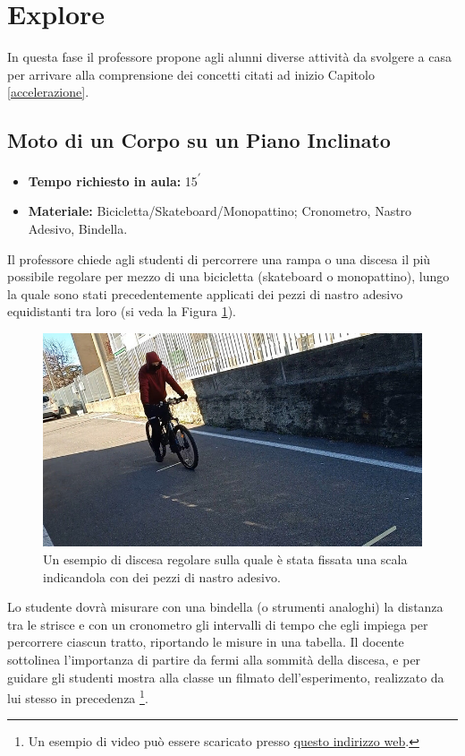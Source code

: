 \documentclass{report} \usepackage[T1]{fontenc} \usepackage[italian]{babel}
\begin{document}
\section{Explore}

In questa fase il professore propone agli alunni diverse attività da svolgere a
casa per arrivare alla comprensione dei concetti citati ad inizio Capitolo \ref{accelerazione}.

\subsection{Moto di un Corpo su un Piano Inclinato}

\begin{itemize}
\item \textbf{Tempo richiesto in aula:} 15\textsuperscript{$\prime$}
\item \textbf{Materiale:} Bicicletta/Skateboard/Monopattino; Cronometro,
Nastro Adesivo, Bindella.
\end{itemize}

Il professore chiede agli studenti di percorrere una rampa o
una discesa il più possibile regolare per mezzo di una bicicletta (skateboard o
monopattino), lungo la quale sono stati precedentemente applicati dei pezzi di nastro
adesivo equidistanti tra loro (si veda la Figura \ref{fig:bicicletta_rampa}).
\begin{figure}[H]
\centering
  \includegraphics[width=\textwidth]{bicicletta_rampa}
  \caption{Un esempio di discesa regolare sulla quale è stata fissata
           una scala indicandola con dei pezzi di nastro adesivo.
          }
  \label{fig:bicicletta_rampa}
\end{figure}
Lo studente dovrà misurare con una bindella (o strumenti analoghi)
la distanza tra le strisce e con un cronometro gli intervalli di tempo che egli impiega
per percorrere ciascun tratto, riportando le misure in una tabella.
Il docente sottolinea l’importanza di partire da fermi alla sommità della
discesa, e per guidare gli studenti  mostra alla classe un filmato
dell’esperimento, realizzato da lui stesso in precedenza
\footnote{
          Un esempio di video può essere scaricato presso
          \textcolor{blue}{\href{https://github.com/savaroskij/PED1/blob/master/progetto_finale/media/video/bicletta_rampa.mp4?raw=true}{questo indirizzo web}}.
         }.
\end{document}
